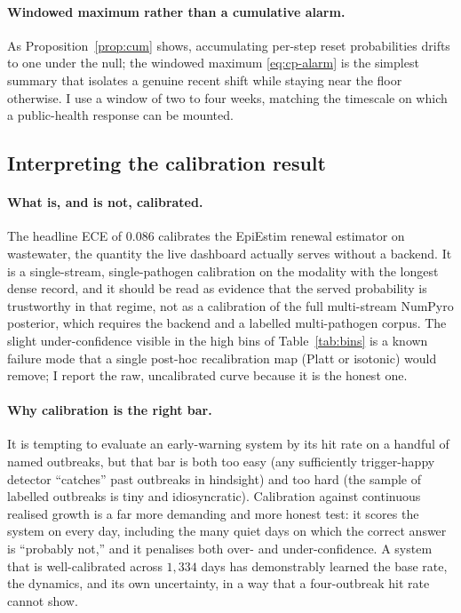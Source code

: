 \documentclass[10pt,twocolumn]{article}
\theoremstyle{definition}
\begin{document}
\paragraph{Windowed maximum rather than a cumulative alarm.}
As Proposition~\ref{prop:cum} shows, accumulating per-step reset probabilities
drifts to one under the null; the windowed maximum \eqref{eq:cp-alarm} is the
simplest summary that isolates a genuine recent shift while staying near the floor
otherwise. I use a window of two to four weeks, matching the timescale on which a
public-health response can be mounted.

\subsection{Interpreting the calibration result}
\label{sec:discuss}

\paragraph{What is, and is not, calibrated.}
The headline ECE of $0.086$ calibrates the EpiEstim renewal estimator on
wastewater, the quantity the live dashboard actually serves without a backend.
It is a single-stream, single-pathogen calibration on the modality with the
longest dense record, and it should be read as evidence that the served
probability is trustworthy in that regime, not as a calibration of the full
multi-stream NumPyro posterior, which requires the backend and a labelled
multi-pathogen corpus. The slight under-confidence visible in the high bins of
Table~\ref{tab:bins} is a known failure mode that a single post-hoc recalibration
map (Platt or isotonic) would remove; I report the raw, uncalibrated curve
because it is the honest one.

\paragraph{Why calibration is the right bar.}
It is tempting to evaluate an early-warning system by its hit rate on a handful of
named outbreaks, but that bar is both too easy (any sufficiently trigger-happy
detector ``catches'' past outbreaks in hindsight) and too hard (the sample of
labelled outbreaks is tiny and idiosyncratic). Calibration against continuous
realised growth is a far more demanding and more honest test: it scores the system
on every day, including the many quiet days on which the correct answer is
``probably not,'' and it penalises both over- and under-confidence. A system that
is well-calibrated across $1{,}334$ days has demonstrably learned the base rate,
the dynamics, and its own uncertainty, in a way that a four-outbreak hit rate
cannot show.
\end{document}
